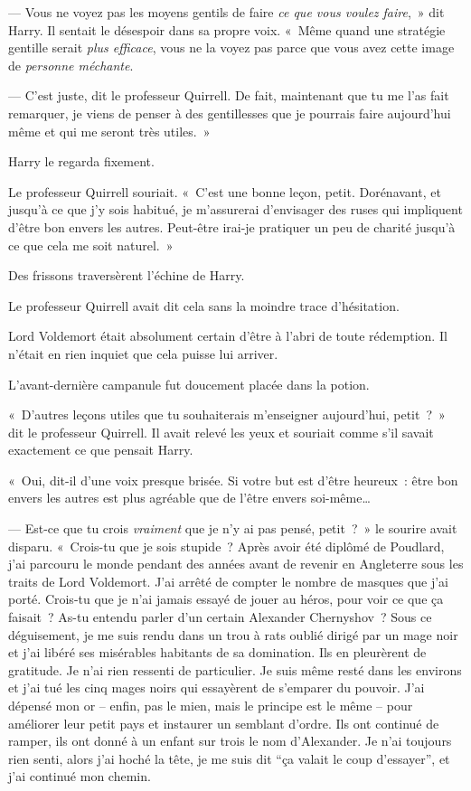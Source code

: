 --- Vous ne voyez pas les moyens gentils de faire \emph{ce que vous voulez faire},~» dit Harry.
Il sentait le désespoir dans sa propre voix.
«~Même quand une stratégie gentille serait \emph{plus efficace}, vous ne la voyez pas parce que vous avez cette image de \emph{personne méchante}.

--- C'est juste, dit le professeur Quirrell.
De fait, maintenant que tu me l'as fait remarquer, je viens de penser à des gentillesses que je pourrais faire aujourd'hui même et qui me seront très utiles.~»

Harry le regarda fixement.

Le professeur Quirrell souriait.
«~C'est une bonne leçon, petit.
Dorénavant, et jusqu'à ce que j'y sois habitué, je m'assurerai d'envisager des ruses qui impliquent d'être bon envers les autres.
Peut-être irai-je pratiquer un peu de charité jusqu'à ce que cela me soit naturel.~»

Des frissons traversèrent l'échine de Harry.

Le professeur Quirrell avait dit cela sans la moindre trace d'hésitation.

Lord Voldemort était absolument certain d'être à l'abri de toute rédemption.
Il n'était en rien inquiet que cela puisse lui arriver.

L'avant-dernière campanule fut doucement placée dans la potion.

«~D'autres leçons utiles que tu souhaiterais m'enseigner aujourd'hui, petit~?~»
dit le professeur Quirrell.
Il avait relevé les yeux et souriait comme s'il savait exactement ce que pensait Harry.

«~Oui, dit-il d'une voix presque brisée.
Si votre but est d'être heureux~: être bon envers les autres est plus agréable que de l'être envers soi-même…

--- Est-ce que tu crois \emph{vraiment} que je n'y ai pas pensé, petit~?~»
le sourire avait disparu.
«~Crois-tu que je sois stupide~?
Après avoir été diplômé de Poudlard, j'ai parcouru le monde pendant des années avant de revenir en Angleterre sous les traits de Lord Voldemort.
J'ai arrêté de compter le nombre de masques que j'ai porté.
Crois-tu que je n'ai jamais essayé de jouer au héros, pour voir ce que ça faisait~?
As-tu entendu parler d'un certain Alexander Chernyshov~?
Sous ce déguisement, je me suis rendu dans un trou à rats oublié dirigé par un mage noir et j'ai libéré ses misérables habitants de sa domination.
Ils en pleurèrent de gratitude.
Je n'ai rien ressenti de particulier.
Je suis même resté dans les environs et j'ai tué les cinq mages noirs qui essayèrent de s'emparer du pouvoir.
J'ai dépensé mon or -- enfin, pas le mien, mais le principe est le même -- pour améliorer leur petit pays et instaurer un semblant d'ordre.
Ils ont continué de ramper, ils ont donné à un enfant sur trois le nom d'Alexander.
Je n'ai toujours rien senti, alors j'ai hoché la tête, je me suis dit “ça valait le coup d'essayer”, et j'ai continué mon chemin.

